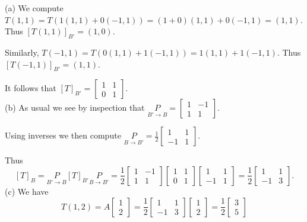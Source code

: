 \begin{solution}
\noindent
(a) We compute $T(1,1)=T\left(1(1,1)+0(-1,1)\right)=(1+0)(1,1)+0(-1,1)=(1,1)$. Thus $[T(1,1)]_{B'}=(1,0)$. 

Similarly, $T(-1,1)=T\left( 0(1,1)+1(-1,1)\right)=1(1,1)+1(-1,1)$. Thus $[T(-1,1)]_{B'}=(1,1)$. 

It follows that $[T]_{B'}=\begin{bmatrix}
1&1\\
0&1
\end{bmatrix}$.
\\
(b) As usual we see by inspection that $\underset{B'\rightarrow B}{P}=\begin{bmatrix}
1&-1\\
1&1
\end{bmatrix}$. 

Using inverses we then compute $\underset{B\rightarrow B'}{P}=\frac{1}{2}\begin{bmatrix}
1&1\\
-1&1
\end{bmatrix}$. 

Thus 
\[
[T]_B=\underset{B'\rightarrow B}{P}[T]_{B'}\underset{B\rightarrow B'}{P}=\frac{1}{2}\begin{bmatrix}
1&-1\\
1&1
\end{bmatrix}\begin{bmatrix}
1&1\\
0&1
\end{bmatrix}\begin{bmatrix}
1&1\\
-1&1
\end{bmatrix}=\frac{1}{2}\begin{bmatrix}
1&1\\
-1&3
\end{bmatrix}.
\]
(c) We have 
\[
T(1,2)=A\begin{bmatrix}
1\\2
\end{bmatrix}=\frac{1}{2}\begin{bmatrix}
1&1\\
-1&3
\end{bmatrix}
\begin{bmatrix}
1\\ 2
\end{bmatrix}
=
\frac{1}{2}\begin{bmatrix}
3\\
5
\end{bmatrix}
\]
\end{solution}

